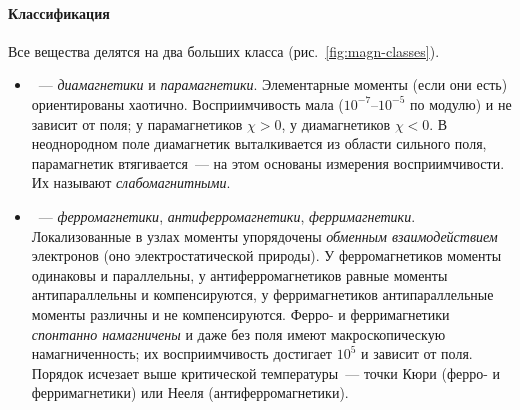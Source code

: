 \paragraph{Классификация}
Все вещества делятся на два больших класса (рис.~\ref{fig:magn-classes}).
\begin{itemize}
\item {}~— \emph{диамагнетики} и
\emph{парамагнетики}. Элементарные моменты (если они есть) ориентированы
хаотично. Восприимчивость мала ($10^{-7}$--$10^{-5}$ по модулю) и не
зависит от поля; у парамагнетиков $\chi>0$, у диамагнетиков $\chi<0$.
В неоднородном поле диамагнетик выталкивается из области сильного
поля, парамагнетик втягивается~— на этом основаны измерения
восприимчивости. Их называют \emph{слабомагнитными}.
\item {}~— \emph{ферромагнетики},
\emph{антиферромагнетики}, \emph{ферримагнетики}. Локализованные в узлах
моменты упорядочены \emph{обменным взаимодействием} электронов (оно
электростатической природы). У ферромагнетиков моменты одинаковы и
параллельны, у антиферромагнетиков равные моменты антипараллельны и
компенсируются, у ферримагнетиков антипараллельные моменты различны и
не компенсируются. Ферро- и ферримагнетики \emph{спонтанно намагничены}
и даже без поля имеют макроскопическую намагниченность; их
восприимчивость достигает $10^5$ и зависит от поля. Порядок исчезает
выше критической температуры~— точки Кюри (ферро- и ферримагнетики) или
Нееля (антиферромагнетики).
\end{itemize}

